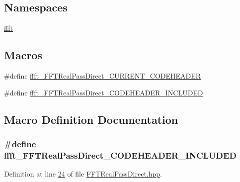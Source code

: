 \subsection*{Namespaces}
\begin{DoxyCompactItemize}
\item 
 \hyperlink{a00142}{ffft}
\end{DoxyCompactItemize}
\subsection*{Macros}
\begin{DoxyCompactItemize}
\item 
\#define \hyperlink{a00101_a882a25e184584d9844f646417865d478}{ffft\+\_\+\+F\+F\+T\+Real\+Pass\+Direct\+\_\+\+C\+U\+R\+R\+E\+N\+T\+\_\+\+C\+O\+D\+E\+H\+E\+A\+D\+E\+R}
\item 
\#define \hyperlink{a00101_a52ec25590b9f985b99eb92f6ac7567b2}{ffft\+\_\+\+F\+F\+T\+Real\+Pass\+Direct\+\_\+\+C\+O\+D\+E\+H\+E\+A\+D\+E\+R\+\_\+\+I\+N\+C\+L\+U\+D\+E\+D}
\end{DoxyCompactItemize}


\subsection{Macro Definition Documentation}
\hypertarget{a00101_a52ec25590b9f985b99eb92f6ac7567b2}{
\subsubsection[{ffft\+\_\+\+F\+F\+T\+Real\+Pass\+Direct\+\_\+\+C\+O\+D\+E\+H\+E\+A\+D\+E\+R\+\_\+\+I\+N\+C\+L\+U\+D\+E\+D}]{\setlength{\rightskip}{0pt plus 5cm}\#define ffft\+\_\+\+F\+F\+T\+Real\+Pass\+Direct\+\_\+\+C\+O\+D\+E\+H\+E\+A\+D\+E\+R\+\_\+\+I\+N\+C\+L\+U\+D\+E\+D}}\label{a00101_a52ec25590b9f985b99eb92f6ac7567b2}


Definition at line \hyperlink{a00101_source_l00024}{24} of file \hyperlink{a00101_source}{F\+F\+T\+Real\+Pass\+Direct.\+hpp}.

